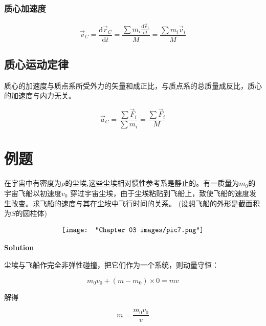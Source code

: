 \documentclass[
	12pt, %
	a4paper, %
]{myLegrandOrangeBook}
\newcommand{\rmd}{\mathrm{d}}
\begin{document}
    \subsubsection*{质心加速度}

    \begin{equation}
        \overrightarrow{v}_C=\frac{\rmd \overrightarrow{r}_C}{\rmd t}=\frac{\sum m_i \frac{\rmd \overrightarrow{r}_i}{\rmd t}}{M}=\frac{\sum m_i \overrightarrow{v}_i}{M}
    \end{equation}

    \subsection{质心运动定律}

    质心的加速度与质点系所受外力的矢量和成正比，与质点系的总质量成反比，质心的加速度与内力无关。

    \begin{equation}
        \overrightarrow{a}_C=\frac{\sum \overrightarrow{F}_i}{\sum m_i}=\frac{\sum \overrightarrow{F}_i}{M}
    \end{equation}


    \section{例题}

    \begin{exercise}

        在宇宙中有密度为\(\rho\)的尘埃,这些尘埃相对惯性参考系是静止的。有一质量为\(m_0\)的宇宙飞船以初速度\(v_0\)
        穿过宇宙尘埃，由于尘埃粘贴到飞船上，致使飞船的速度发生改变。求飞船的速度与其在尘埃中飞行时间的关系。
        (设想飞船的外形是截面积为\(S\)的圆柱体)

        \vspace{1em}
        \[
            \centering
            \texttt{[image: "Chapter 03 images/pic7.png"]}
            \label{pic7}
        \]
    
    \end{exercise}

    \textbf{Solution}
    \vspace{1em}

    尘埃与飞船作完全非弹性碰撞，把它们作为一个系统，则动量守恒：

    $$
        m_0 v_0+\left(m-m_0\right) \times 0=m v
    $$

    解得

    \[
        m = \frac{m_0v_0}{v}
    \]
\end{document}
